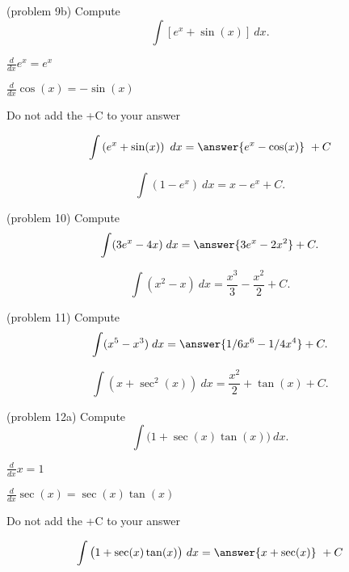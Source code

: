 \documentclass[handout]{ximera}
\begin{document}
\begin{problem}(problem 9b)
Compute
\[
\int \left[e^x + \sin(x) \right] \ dx.
\]

\begin{hint}
$\frac{d}{dx} e^x = e^x$
\end{hint}
\begin{hint}
$\frac{d}{dx} \cos(x) = -\sin(x)$
\end{hint}
\begin{hint}
\begin{center}
Do not add the +C to your answer
\end{center}
\end{hint}

\[
\int \left(e^x + \sin(x) \right) \ dx =
\answer{e^x -\cos(x)} \ +  C
\]
\end{problem}


\begin{example}[example 10]
\[
\int \left(1 - e^x\right) \ dx = x - e^x + C.
\]
\end{example}

\begin{problem}(problem 10)
Compute
\[
\int (3e^x - 4x) \; dx = \answer{3e^x - 2x^2} + C.
\]
\end{problem}



\begin{example}[example 11]
\[
\int \left(x^2 - x\right) \ dx = \dfrac{x^3}{3} - \dfrac{x^2}{2} + C.
\]
\end{example}


\begin{problem}(problem 11)
Compute
\[
\int (x^5 - x^3) \; dx = \answer{1/6 x^6 - 1/4 x^4} + C.
\]
\end{problem}




\begin{example}[example 12]
\[
\int \left(x + \sec^2(x)\right) \ dx = \frac{x^2}{2} + \tan(x) + C.
\]
\end{example}

\begin{problem}(problem 12a)
Compute
\[
\int \big(1 + \sec(x)\tan(x) \big) \ dx.
\]

\begin{hint}
$\frac{d}{dx} x = 1$
\end{hint}
\begin{hint}
$\frac{d}{dx} \sec(x) = \sec(x)\tan(x)$
\end{hint}
\begin{hint}
\begin{center}
Do not add the +C to your answer
\end{center}
\end{hint}

\[
\int \big(1 + \sec(x)\tan(x) \big) \ dx =
\answer{x + \sec(x)} \ +  C
\]
\end{problem}
\end{document}
